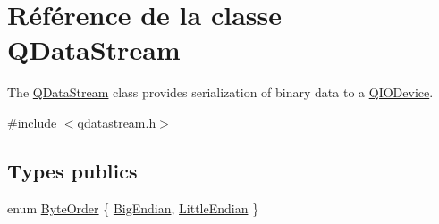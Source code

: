 \hypertarget{class_q_data_stream}{}\section{Référence de la classe Q\+Data\+Stream}
\label{class_q_data_stream}


The \hyperlink{class_q_data_stream}{Q\+Data\+Stream} class provides serialization of binary data to a \hyperlink{class_q_i_o_device}{Q\+I\+O\+Device}.  




{\ttfamily \#include $<$qdatastream.\+h$>$}

\subsection*{Types publics}
\begin{DoxyCompactItemize}
\item 
enum \hyperlink{class_q_data_stream_a0cc872752a2cc23a0cf2bcb359cdf135}{Byte\+Order} \{ \hyperlink{class_q_data_stream_a0cc872752a2cc23a0cf2bcb359cdf135ab7cf4164d1175a7377c64f8671bc28de}{Big\+Endian}, 
\hyperlink{class_q_data_stream_a0cc872752a2cc23a0cf2bcb359cdf135a646810b428b314ff8dd6bedb589f0f5a}{Little\+Endian}
 \}
\end{DoxyCompactItemize}

